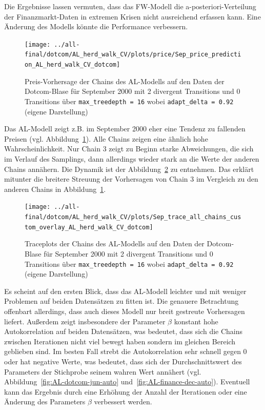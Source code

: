 \documentclass[ngerman]{ttlab-qualify}
\begin{document}
Die Ergebnisse lassen vermuten, dass das FW-Modell die a-posteriori-Verteilung der Finanzmarkt-Daten in extremen Krisen nicht ausreichend erfassen kann. Eine Änderung des Modells könnte die Performance verbessern.

\begin{figure}[H]
\begin{center}
\texttt{[image: ../all-final/dotcom/AL\_herd\_walk\_CV/plots/price/Sep\_price\_prediction\_AL\_herd\_walk\_CV\_dotcom]}
\caption{Preis-Vorhersage der Chains des AL-Modells auf den Daten der Dotcom-Blase für September 2000 mit 2 divergent Transitions und 0 Transitions über \texttt{max\_treedepth  = 16} wobei \texttt{adapt\_delta = 0.92} (eigene Darstellung)}
\label{fig:AL-dotcom-sep}
\end{center}
\end{figure}

Das AL-Modell zeigt z.B. im September 2000 eher eine Tendenz zu fallenden Preisen (vgl. Abbildung~\ref{fig:AL-dotcom-sep}). Alle Chains zeigen eine ähnlich hohe Wahrscheinlichkeit. Nur Chain 3 zeigt zu Beginn starke Abweichungen, die sich im Verlauf des Samplings, dann allerdings wieder stark an die Werte der anderen Chains annähern. Die Dynamik ist der Abbildung~\ref{fig:AL-dotcom-sep-trace} zu entnehmen. Das erklärt mitunter die breitere Streuung der Vorhersagen von Chain 3 im Vergleich zu den anderen Chains in Abbildung~\ref{fig:AL-dotcom-sep}.

\begin{figure}[H]
\begin{center}
\texttt{[image: ../all-final/dotcom/AL\_herd\_walk\_CV/plots/Sep\_trace\_all\_chains\_custom\_overlay\_AL\_herd\_walk\_CV\_dotcom]}
\caption{Traceplots der Chains des AL-Modells auf den Daten der Dotcom-Blase für September 2000 mit 2 divergent Transitions und 0 Transitions über \texttt{max\_treedepth  = 16} wobei \texttt{adapt\_delta = 0.92} (eigene Darstellung)}
\label{fig:AL-dotcom-sep-trace}
\end{center}
\end{figure}

Es scheint auf den ersten Blick, dass das AL-Modell leichter und mit weniger Problemen auf beiden Datensätzen zu fitten ist. Die genauere Betrachtung offenbart allerdings, dass auch dieses Modell nur breit gestreute Vorhersagen liefert. Außerdem zeigt insbesondere der Parameter $\beta$ konstant hohe Autokorrelation auf beiden Datensätzen, was bedeutet, dass sich die Chains zwischen Iterationen nicht viel bewegt haben sondern im gleichen Bereich geblieben sind. Im besten Fall strebt die Autokorrelation sehr schnell gegen 0 oder hat negative Werte, was bedeutet, dass sich der Durchschnittswert des Parameters der Stichprobe seinem wahren Wert annähert (vgl. Abbildung~\ref{fig:AL-dotcom-jun-auto} und~\ref{fig:AL-finance-dec-auto}). Eventuell kann das Ergebnis durch eine Erhöhung der Anzahl der Iterationen oder eine Änderung des Parameters $\beta$ verbessert werden.
\end{document}
